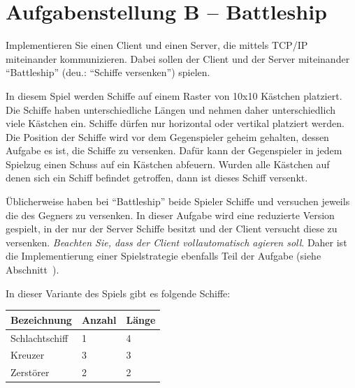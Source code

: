 



\usepackage{graphicx}
\usepackage{bytefield}

\newcommand{\baselinecenterit}[1]{%
  \centering
  \raisebox{0pt}[\heightof{W}][0pt]{\itshape #1}%
}


\sloppy
{}

\section*{Aufgabenstellung B -- Battleship}\label{sec:aufgabenstellung}
Implementieren Sie einen Client und einen Server, die mittels TCP/IP
miteinander kommunizieren. Dabei sollen der Client und der Server miteinander
``Battleship'' (deu.: ``Schiffe versenken'') spielen.

In diesem Spiel werden Schiffe auf einem Raster von 10x10 Kästchen platziert.
Die Schiffe haben unterschiedliche Längen und nehmen daher unterschiedlich viele Kästchen ein.
Schiffe dürfen nur horizontal oder vertikal platziert werden.
Die Position der Schiffe wird vor dem Gegenspieler geheim gehalten,
dessen Aufgabe es ist, die Schiffe zu versenken.
Dafür kann der Gegenspieler in jedem Spielzug einen Schuss auf ein Kästchen abfeuern.
Wurden alle Kästchen auf denen sich ein Schiff befindet getroffen, dann ist dieses Schiff versenkt.

Üblicherweise haben bei ``Battleship'' beide Spieler Schiffe und versuchen jeweils die des Gegners
zu versenken. In dieser Aufgabe wird eine reduzierte Version gespielt,
in der nur der Server Schiffe besitzt und der Client versucht diese zu versenken.
\emph{Beachten Sie, dass der Client vollautomatisch agieren soll}. Daher
ist die Implementierung einer Spielstrategie ebenfalls Teil der Aufgabe
(siehe Abschnitt~).

In dieser Variante des Spiels gibt es folgende Schiffe:

{\centering
\begin{tabular}{ | l | l | l | }
\hline
Bezeichnung    & Anzahl & Länge \\
\hline
Schlachtschiff & 1 & 4 \\
Kreuzer        & 3 & 3 \\
Zerstörer      & 2 & 2 \\
\hline
\end{tabular}\par
}

